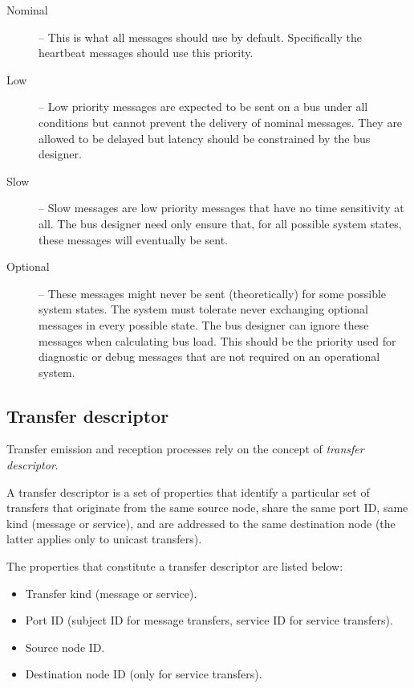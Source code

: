 \begin{remark}[breakable]
\begin{description}
        \item[Nominal] -- This is what all messages should use by default.
        Specifically the heartbeat messages should use this priority.

        \item[Low] -- Low priority messages are expected to be sent on a bus under all conditions but cannot
        prevent the delivery of nominal messages.
        They are allowed to be delayed but latency should be constrained by the bus designer.

        \item[Slow] -- Slow messages are low priority messages that have no time sensitivity at all.
        The bus designer need only ensure that, for all possible system states,
        these messages will eventually be sent.

        \item[Optional] -- These messages might never be sent (theoretically) for some possible system states.
        The system must tolerate never exchanging optional messages in every possible state.
        The bus designer can ignore these messages when calculating bus load.
        This should be the priority used for diagnostic or debug messages that are not required on an
        operational system.
    \end{description}
\end{remark}

\subsection{Transfer descriptor}\label{sec:transfer_descriptor}

Transfer emission and reception processes rely on the concept of \emph{transfer descriptor}.

A transfer descriptor is a set of properties that identify a particular set of transfers that originate
from the same source node, share the same port ID, same kind (message or service), and are addressed to the same
destination node (the latter applies only to unicast transfers).

The properties that constitute a transfer descriptor are listed below:

\begin{itemize}
    \item Transfer kind (message or service).
    \item Port ID (subject ID for message transfers, service ID for service transfers).
    \item Source node ID.
    \item Destination node ID (only for service transfers).
\end{itemize}

